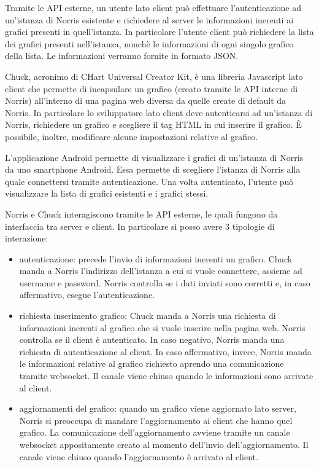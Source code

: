    Tramite le API esterne, un utente lato client può effettuare l'autenticazione ad un'istanza di Norris esistente e richiedere al server le informazioni inerenti ai grafici presenti in quell'istanza. In particolare l'utente client può richiedere la lista dei grafici presenti nell'istanza, nonchè le informazioni di ogni singolo grafico della lista. Le informazioni verranno fornite in formato JSON.

    Chuck, acronimo di CHart Universal Creator Kit, è una libreria Javascript lato client che permette di incapsulare un grafico (creato tramite le API interne di Norris) all'interno di una pagina web diversa da quelle create di default da Norris. In particolare lo sviluppatore lato client deve autenticarsi ad un'istanza di Norris, richiedere un grafico e scegliere il tag HTML in cui inserire il grafico. È possibile, inoltre, modificare alcune impostazioni relative al grafico.
    
    L'applicazione Android permette di visualizzare i grafici di un'istanza di Norris da uno smartphone Android. Essa permette di scegliere l'istanza di Norris alla quale connettersi tramite autenticazione. Una volta autenticato, l'utente può visualizzare la lista di grafici esistenti e i grafici stessi.
        
    Norris e Chuck interagiscono tramite le API esterne, le quali fungono da interfaccia tra server e client. In particolare si posso avere 3 tipologie di interazione:
    \begin{itemize}
        \item autenticazione: precede l'invio di informazioni inerenti un grafico. Chuck manda a Norris l'indirizzo dell'istanza a cui si vuole connettere, assieme ad username e password. Norris controlla se i dati inviati sono corretti e, in caso affermativo, esegue l'autenticazione.
        \item richiesta inserimento grafico: Chuck manda a Norris una richiesta di informazioni inerenti al grafico che si vuole inserire nella pagina web. Norris controlla se il client è autenticato. In caso negativo, Norris manda una richiesta di autenticazione al client. In caso affermativo, invece, Norris manda le informazioni relative al grafico richiesto aprendo una comunicazione tramite websocket. Il canale viene chiuso quando le informazioni sono arrivate al client.
        \item aggiornamenti del grafico: quando un grafico viene aggiornato lato server, Norris si preoccupa di mandare l'aggiornamento ai client che hanno quel grafico. La comunicazione dell'aggiornamento avviene tramite un canale websocket appositamente creato al momento dell'invio dell'aggiornamento. Il canale viene chiuso quando l'aggiornamento è arrivato al client.
    \end{itemize}
    
